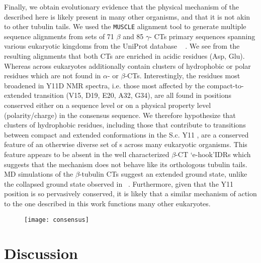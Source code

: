 Finally, we obtain evolutionary evidence that the physical mechanism of the \gct described here is likely present in many other organisms, and that it is not akin to other tubulin tails.  We used the \texttt{MUSCLE} alignment tool \cite{edgar2004muscle} to generate multiple sequence alignments from sets of 71 $\beta$ and 85 $\gamma$- CTs primary sequences spanning various eukaryotic kingdoms from the UniProt database ~\cite{apweiler2004uniprot} .  We see from the resulting alignments that both CTs are enriched in acidic residues (Asp, Glu). Whereas \gct across eukaryotes additionally contain clusters of hydrophobic or polar residues which are not found in $\alpha$- or $\beta$-CTs. Interestingly, the residues most broadened in Y11D NMR spectra, i.e. those most affected by the compact-to-extended transition (V15, D19, E20, A32, G34), are all found in positions conserved either on a sequence level or on a physical property level (polarity/charge) in the consensus \gct sequence. We therefore hypothesize that clusters of hydrophobic residues, including those that contribute to transitions between compact and extended conformations in the S.c. Y11 \gct, are a conserved feature of an otherwise diverse set of \gct s across many eukaryotic organisms. This feature appears to be absent in the well characterized $\beta$-CT \lq e-hook\rq IDRs which suggests that the \gct mechanism does not behave like its orthologous tubulin tails. MD simulations of the $\beta$-tubulin CTs suggest an extended ground state, unlike the collapsed ground state observed in \gct ~\cite{luchko2008conformational}.   Furthermore, given that the Y11 position is so pervasively conserved, it is likely that a similar mechanism of action to the one described in this work functions many other eukaryotes.

\begin{figure}
\centering
\texttt{[image: consensus]}
\label{fig:alignment}
\end{figure}

\section{Discussion}

